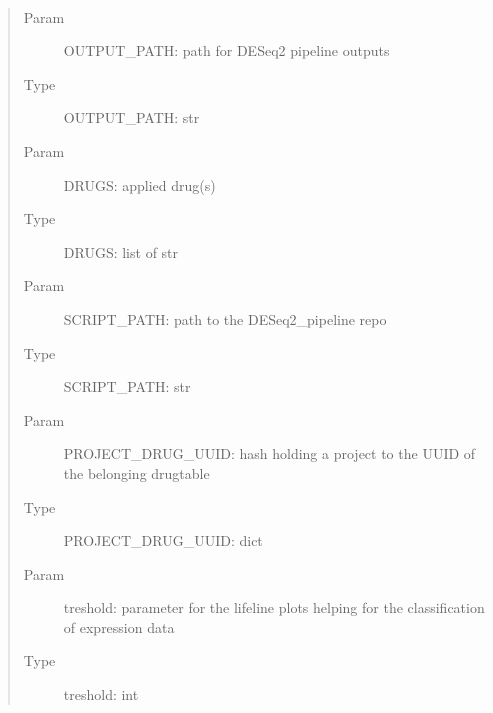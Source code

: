 \documentclass[letterpaper,10pt,english]{sphinxmanual}
\begin{document}
\label{\detokenize{index:module-create_report}}

\begin{fulllineitems}
\label{\detokenize{index:create_report.create_report_pdf}}~\begin{quote}\begin{description}
\item[{Param}] \leavevmode
\sphinxAtStartPar
OUTPUT\_PATH: path for DESeq2 pipeline outputs

\item[{Type}] \leavevmode
\sphinxAtStartPar
OUTPUT\_PATH: str

\item[{Param}] \leavevmode
\sphinxAtStartPar
DRUGS: applied drug(s)

\item[{Type}] \leavevmode
\sphinxAtStartPar
DRUGS: list of str

\item[{Param}] \leavevmode
\sphinxAtStartPar
SCRIPT\_PATH: path to the DESeq2\_pipeline repo

\item[{Type}] \leavevmode
\sphinxAtStartPar
SCRIPT\_PATH: str

\item[{Param}] \leavevmode
\sphinxAtStartPar
PROJECT\_DRUG\_UUID: hash holding a project to the UUID of the    belonging drugtable

\item[{Type}] \leavevmode
\sphinxAtStartPar
PROJECT\_DRUG\_UUID: dict

\item[{Param}] \leavevmode
\sphinxAtStartPar
treshold: parameter for the lifeline plots helping for the    classification of expression data

\item[{Type}] \leavevmode
\sphinxAtStartPar
treshold: int

\end{description}\end{quote}


\end{fulllineitems}
\end{document}
